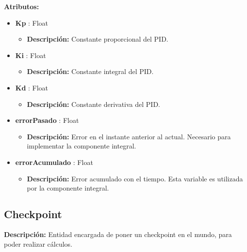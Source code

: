 \textbf{Atributos: }
\begin{itemize}
    \item \textbf{Kp} : Float
    \begin{itemize}
        \item \textbf{Descripción: }Constante proporcional del PID.
    \end{itemize}
    
    \item \textbf{Ki} : Float
    \begin{itemize}
        \item \textbf{Descripción: }Constante integral del PID.
    \end{itemize}
    
    \item \textbf{Kd} : Float
    \begin{itemize}
        \item \textbf{Descripción: }Constante derivativa del PID.
    \end{itemize}        


    \item \textbf{errorPasado} : Float
    \begin{itemize}
        \item \textbf{Descripción: }Error en el instante anterior al actual. Necesario para implementar la componente integral.
    \end{itemize}

    \item \textbf{errorAcumulado} : Float
    \begin{itemize}
        \item \textbf{Descripción: }Error acumulado con el tiempo. Esta variable es utilizada por la componente integral.
    \end{itemize}
\end{itemize}

\subsection{Checkpoint}
\textbf{Descripción: }Entidad encargada de poner un checkpoint en el mundo, para poder realizar cálculos.

\bigskip

